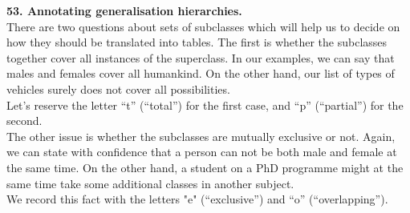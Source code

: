 
\textbf{53. Annotating generalisation hierarchies.} \\
There are two questions about sets of subclasses which will help
us to decide on how they should be translated into tables. The first is whether the subclasses together cover all
instances of the superclass. In our examples, we can say that males and females cover all humankind. On the other
hand, our list of types of vehicles surely does not cover all possibilities. \\
Let's reserve the letter “t” (“total”) for the first case, and “p” (“partial”) for the second. \\
The other issue is whether the subclasses are mutually exclusive or not. Again, we can state with confidence that
a person can not be both male and female at the same time. On the other hand, a student on a PhD programme
might at the same time take some additional classes in another subject. \\
We record this fact with the letters "e" (“exclusive”) and “o” (“overlapping”).

